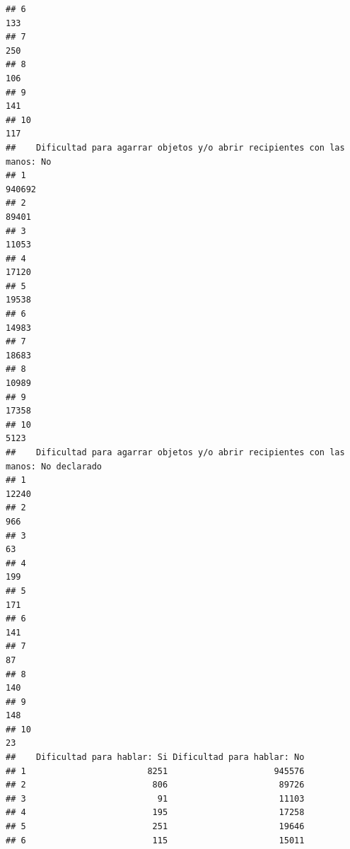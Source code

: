 \documentclass[11pt,]{article}
\begin{document}
\begin{verbatim}
## 6                                                                      133
## 7                                                                      250
## 8                                                                      106
## 9                                                                      141
## 10                                                                     117
##    Dificultad para agarrar objetos y/o abrir recipientes con las manos: No
## 1                                                                   940692
## 2                                                                    89401
## 3                                                                    11053
## 4                                                                    17120
## 5                                                                    19538
## 6                                                                    14983
## 7                                                                    18683
## 8                                                                    10989
## 9                                                                    17358
## 10                                                                    5123
##    Dificultad para agarrar objetos y/o abrir recipientes con las manos: No declarado
## 1                                                                              12240
## 2                                                                                966
## 3                                                                                 63
## 4                                                                                199
## 5                                                                                171
## 6                                                                                141
## 7                                                                                 87
## 8                                                                                140
## 9                                                                                148
## 10                                                                                23
##    Dificultad para hablar: Si Dificultad para hablar: No
## 1                        8251                     945576
## 2                         806                      89726
## 3                          91                      11103
## 4                         195                      17258
## 5                         251                      19646
## 6                         115                      15011

\end{verbatim}
\end{document}
